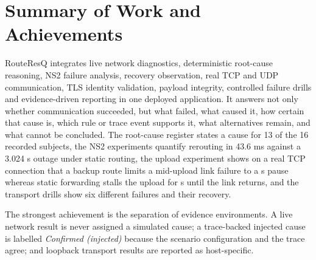 \documentclass[12pt,a4paper]{report}
\numberwithin{equation}{chapter}
\begin{document}
\section{Summary of Work and Achievements}
RouteResQ integrates live network diagnostics, deterministic root-cause reasoning, NS2 failure analysis, recovery observation, real TCP and UDP communication, TLS identity validation, payload integrity, controlled failure drills and evidence-driven reporting in one deployed application. It answers not only whether communication succeeded, but what failed, what caused it, how certain that cause is, which rule or trace event supports it, what alternatives remain, and what cannot be concluded. The root-cause register states a cause for 13 of the 16 recorded subjects, the NS2 experiments quantify rerouting in 43.6 ms against a 3.024 s outage under static routing, the upload experiment shows on a real TCP connection that a backup route limits a mid-upload link failure to a \upFailStall{} s pause whereas static forwarding stalls the upload for \upStatStall{} s until the link returns, and the transport drills show six different failures and their recovery.

The strongest achievement is the separation of evidence environments. A live network result is never assigned a simulated cause; a trace-backed injected cause is labelled \emph{Confirmed (injected)} because the scenario configuration and the trace agree; and loopback transport results are reported as host-specific.
\end{document}
